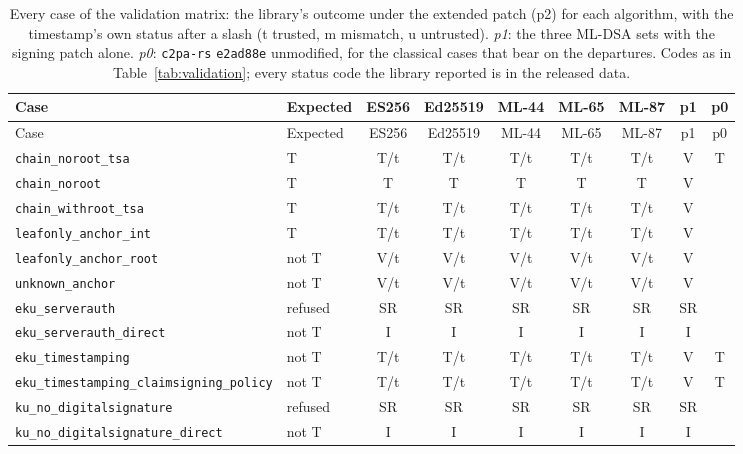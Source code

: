 {\footnotesize
\begin{longtable}{>{\raggedright\arraybackslash}p{4.2cm}p{1.2cm}ccccccc}
\caption{Every case of the validation matrix: the library's outcome under the extended patch (p2) for each algorithm, with the timestamp's own status after a slash (t trusted, m mismatch, u untrusted). \emph{p1}: the three ML-DSA sets with the signing patch alone. \emph{p0}: \texttt{c2pa-rs} \texttt{e2ad88e} unmodified, for the classical cases that bear on the departures. Codes as in Table~\ref{tab:validation}; every status code the library reported is in the released data.}\label{tab:valfull}\\
\toprule
Case & Expected & ES256 & Ed25519 & ML-44 & ML-65 & ML-87 & p1 & p0\\
\midrule
\endfirsthead
\toprule
Case & Expected & ES256 & Ed25519 & ML-44 & ML-65 & ML-87 & p1 & p0\\
\midrule
\endhead
\bottomrule
\endfoot
\texttt{chain\_\allowbreak{}noroot\_\allowbreak{}tsa} & T & T/t & T/t & T/t & T/t & T/t & V & T\\
\texttt{chain\_\allowbreak{}noroot} & T & T & T & T & T & T & V & \\
\texttt{chain\_\allowbreak{}withroot\_\allowbreak{}tsa} & T & T/t & T/t & T/t & T/t & T/t & V & \\
\texttt{leafonly\_\allowbreak{}anchor\_\allowbreak{}int} & T & T/t & T/t & T/t & T/t & T/t & V & \\
\texttt{leafonly\_\allowbreak{}anchor\_\allowbreak{}root} & not T & V/t & V/t & V/t & V/t & V/t & V & \\
\texttt{unknown\_\allowbreak{}anchor} & not T & V/t & V/t & V/t & V/t & V/t & V & \\
\texttt{eku\_\allowbreak{}serverauth} & refused & SR & SR & SR & SR & SR & SR & \\
\texttt{eku\_\allowbreak{}serverauth\_\allowbreak{}direct} & not T & I & I & I & I & I & I & \\
\texttt{eku\_\allowbreak{}timestamping} & not T & T/t & T/t & T/t & T/t & T/t & V & T\\
\texttt{eku\_\allowbreak{}timestamping\_\allowbreak{}claimsigning\_\allowbreak{}policy} & not T & T/t & T/t & T/t & T/t & T/t & V & T\\
\texttt{ku\_\allowbreak{}no\_\allowbreak{}digitalsignature} & refused & SR & SR & SR & SR & SR & SR & \\
\texttt{ku\_\allowbreak{}no\_\allowbreak{}digitalsignature\_\allowbreak{}direct} & not T & I & I & I & I & I & I & \\

\end{longtable}}
